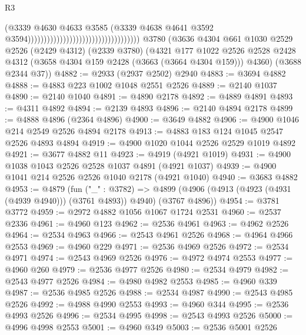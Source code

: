 \begin{lexlean}{R3}
\begin{coremodule}
                                                                      (@3339
                                                                        @4630
                                                                        @4633
                                                                        @3585
                                                                        (@3339
                                                                          @4638
                                                                          @4641
                                                                          @3592
                                                                          @3594)))))))))))))))))))))))))))))))))))
    @3780
    (@3636
      @4304
      @661
      @1030
      @2529
      @2526
      (@2429 @4312)
      (@2339 @3780)
      (@4321
        @177
        @1022
        @2526
        @2528
        @2428
        @4312
        (@3658 @4304 @159 @2428 (@3663 (@3664 @4304 @159)))
        @4360)
      (@3688 @2344 @37))
@4882 := @2933 (@2937 @2502) @2940
@4883 := @3694 @4882
@4888 := @4883 @223 @1002 @1048 @2551 @2526
@4889 := @2140 @1037
@4890 := @2140 @1040
@4891 := @4890 @2178
@4892 := @4889 @4891
@4893 := @4311 @4892
@4894 := @2139 @4893
@4896 := @2140 @4894 @2178
@4899 := @4888 @4896 (@2364 @4896)
@4900 := @3649 @4882
@4906 := @4900 @1046 @214 @2549 @2526 @4894 @2178
@4913 := @4883 @183 @124 @1045 @2547 @2526 @4893 @4894
@4919 := @4900 @1020 @1044 @2526 @2529 @1019 @4892
@4921 := @3677 @4882 @11
@4923 := @4919 (@4921 @1019)
@4931 := @4900 @1038 @1043 @2526 @2528 @1037 @4891 (@4921 @1037)
@4939 := @4900 @1041 @214 @2526 @2526 @1040 @2178 (@4921 @1040)
@4940 := @3683 @4882
@4953 := @4879
    (fun ("_" : @3782) =>
    @4899 (@4906 (@4913 (@4923 (@4931 (@4939 @4940))) (@3761 @4893)) @4940) (@3767 @4896))
@4954 := @3781 @3772
@4959 := @2972 @4882 @1056 @1067 @1724 @2531
@4960 := @2537 @2336
@4961 := @4960 @123
@4962 := @2536 @4961
@4963 := @4962 @2526
@4964 := @2534 @4963
@4966 := @2543 @4961 @2526
@4968 := @4964 @4966 @2553
@4969 := @4960 @229
@4971 := @2536 @4969 @2526
@4972 := @2534 @4971
@4974 := @2543 @4969 @2526
@4976 := @4972 @4974 @2553
@4977 := @4960 @260
@4979 := @2536 @4977 @2526
@4980 := @2534 @4979
@4982 := @2543 @4977 @2526
@4984 := @4980 @4982 @2553
@4985 := @4960 @339
@4987 := @2536 @4985 @2526
@4988 := @2534 @4987
@4990 := @2543 @4985 @2526
@4992 := @4988 @4990 @2553
@4993 := @4960 @344
@4995 := @2536 @4993 @2526
@4996 := @2534 @4995
@4998 := @2543 @4993 @2526
@5000 := @4996 @4998 @2553
@5001 := @4960 @349
@5003 := @2536 @5001 @2526

\end{coremodule}
\end{lexlean}
